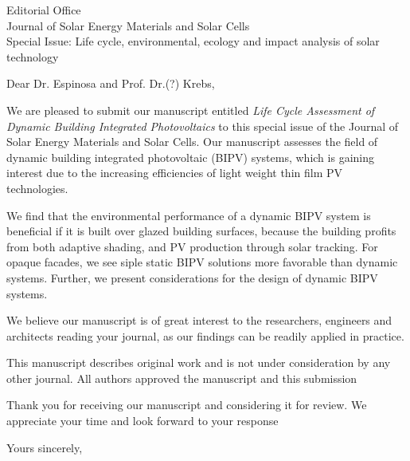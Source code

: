 \documentclass[a4paper,12pt]{letter}
\begin{document}
\begin{letter}{Editorial Office \\ Journal of Solar Energy Materials and Solar Cells\\ Special Issue: Life cycle, environmental, ecology and impact analysis of solar technology}
	\opening{Dear Dr. Espinosa and Prof. Dr.(?) Krebs,}
	We are pleased to submit our manuscript entitled \emph{Life Cycle Assessment of Dynamic Building Integrated Photovoltaics} to this special issue of the Journal of Solar Energy Materials and Solar Cells. 
	Our manuscript assesses the field of dynamic building integrated photovoltaic (BIPV) systems, which is gaining interest due to the increasing efficiencies of light weight thin film PV technologies. 



	We find that the environmental performance of a dynamic BIPV system is beneficial if it is built over glazed building surfaces, because the building profits from both adaptive shading, and PV production through solar tracking. For opaque facades, we see siple static BIPV solutions more favorable than dynamic systems. Further, we present considerations for the design of dynamic BIPV systems.
	
	We believe our manuscript is of great interest to the researchers, engineers and architects reading your journal, as our findings can be readily applied in practice.

	This manuscript describes original work and is not under consideration by any other journal. All authors approved the manuscript and this submission

	Thank you for receiving our manuscript and considering it for review. We appreciate your time and look forward to your response

	\signature{Prageeth Jayathissa}
	\closing{Yours sincerely,}
\end{letter}

	
\end{document}
